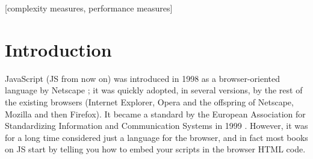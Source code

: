 \documentclass{sig-alternate}
\begin{document}
\maketitle
\begin{abstract}After more than fifteen years, JavaScript has finally risen as a popular
language for implementing all kind of applications, from server-based
to rich Internet Applications. The fact that it is implemented in the browser and in server-side tools makes it interesting for
designing evolutionary algorithm frameworks 
that encompass both
tiers, but besides, they allow a change in paradigm that goes beyond
the canonical evolutionary algorithm. 
In this paper we will experiment
with different architectures, client-server and peer to peer to assess which ones offer most advantages in terms of
performance, scalability and ease of use 
for the computer scientist. All implementations  have been released as open source, and besides showing that the concept of working with evolutionary algorithms in JavaScript can be done efficiently, we prove that a master-slave parallel architecture offers the best combination of time and algorithmic improvements in a parallel evolutionary algorithm that leverages JavaScript implementation features.

\end{abstract}

[complexity measures, performance measures]


\section{Introduction}

JavaScript (JS from now on) was introduced in 1998 as a browser-oriented language by
Netscape \cite{flanagan1998javascript}; it was quickly adopted, in
several versions, by the rest of the existing browsers (Internet
Explorer, Opera and the offspring of Netscape, Mozilla and then
Firefox). It became a standard by the European Association for
Standardizing Information and Communication Systems in 1999
\cite{ecma1999262}. However, it was for a long time considered just a
language for the browser, and in fact most books on JS
\cite{goodman2007javascript} start by
telling you how to embed your scripts in the browser HTML code.
\end{document}
